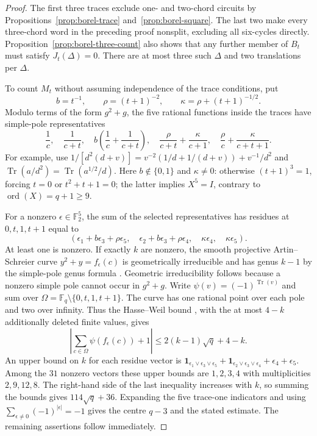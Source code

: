 \documentclass[11pt,a4paper]{article}
\theoremstyle{definition}
\theoremstyle{remark}
\newcommand{\ord}{\operatorname{ord}}
\begin{document}
\begin{proof}
The first three traces exclude one- and two-chord circuits by Propositions~\ref{prop:borel-trace} and~\ref{prop:borel-square}.  The last two make every three-chord word in the preceding proof nonsplit, excluding all six-cycles directly.  Proposition~\ref{prop:borel-three-count} also shows that any further member of $B_t$ must satisfy $J_t(\Delta)=0$.  There are at most three such $\Delta$ and two translations per $\Delta$.

To count $M_t$ without assuming independence of the trace conditions, put
\[
 b=t^{-1},\qquad \rho=(t+1)^{-2},\qquad
 \kappa=\rho+(t+1)^{-1/2}.
\]
Modulo terms of the form $g^2+g$, the five rational functions inside the traces have simple-pole representatives
\[
 \frac1c,\quad\frac1{c+t},\quad b\left(\frac1c+\frac1{c+t}\right),\quad
 \frac\rho{c+t}+\frac\kappa{c+1},\quad
 \frac\rho c+\frac\kappa{c+t+1}.
\]
For example, use $1/[d^2(d+v)]=v^{-2}(1/d+1/(d+v))+v^{-1}/d^2$ and $\operatorname{Tr}(a/d^2)=\operatorname{Tr}(a^{1/2}/d)$.  Here $b\notin\{0,1\}$ and $\kappa\ne0$: otherwise $(t+1)^3=1$, forcing $t=0$ or $t^2+t+1=0$; the latter implies $X^5=I$, contrary to $\ord(X)=q+1\ge9$.

For a nonzero $\epsilon\in\mathbb F_2^5$, the sum of the selected representatives has residues at $0,t,1,t+1$ equal to
\[
 (\epsilon_1+b\epsilon_3+\rho\epsilon_5,\quad
  \epsilon_2+b\epsilon_3+\rho\epsilon_4,\quad
  \kappa\epsilon_4,\quad\kappa\epsilon_5).
\]
At least one is nonzero.  If exactly $k$ are nonzero, the smooth projective Artin--Schreier curve $y^2+y=f_\epsilon(c)$ is geometrically irreducible and has genus $k-1$ by the simple-pole genus formula \cite[Lemma~2.6]{PriesZhu12}.  Geometric irreducibility follows because a nonzero simple pole cannot occur in $g^2+g$.  Write $\psi(v)=(-1)^{\operatorname{Tr}(v)}$ and sum over $\Omega=\mathbb F_q\setminus\{0,t,1,t+1\}$.  The curve has one rational point over each pole and two over infinity.  Thus the Hasse--Weil bound \cite[Introduction]{KreschWetherellZieve02}, with the at most $4-k$ additionally deleted finite values, gives
\[
 \left|\sum_{c\in\Omega}\psi(f_\epsilon(c))+1\right|
                  \le 2(k-1)\sqrt q+4-k.
\]
An upper bound on $k$ for each residue vector is
$\mathbf1_{\epsilon_1\vee\epsilon_3\vee\epsilon_5}
 +\mathbf1_{\epsilon_2\vee\epsilon_3\vee\epsilon_4}
 +\epsilon_4+\epsilon_5$.
Among the $31$ nonzero vectors these upper bounds are $1,2,3,4$ with multiplicities $2,9,12,8$.  The right-hand side of the last inequality increases with $k$, so summing the bounds gives $114\sqrt q+36$.  Expanding the five trace-one indicators and using $\sum_{\epsilon\ne0}(-1)^{|\epsilon|}=-1$ gives the centre $q-3$ and the stated estimate.  The remaining assertions follow immediately.
\end{proof}
\end{document}
